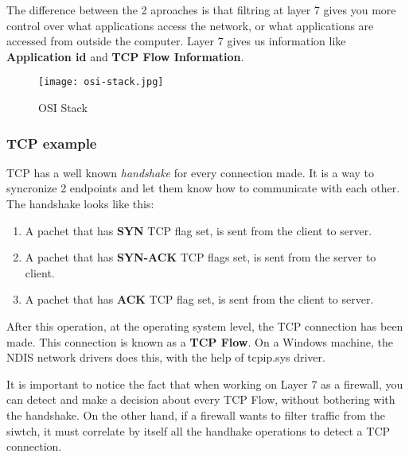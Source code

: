 \vspace{5mm}

The difference between the 2 aproaches is that filtring at layer 7 gives you more control over what applications access the network, or what applications
are accessed from outside the computer. Layer 7 gives us information like \textbf{Application id} and \textbf{TCP Flow Information}.

\vspace{5mm}

\begin{figure}[h]
\centering
\texttt{[image: osi-stack.jpg]}
\caption{OSI Stack}
\label{osi-stack}
\end{figure}

\vspace{5mm}
\subsubsection{TCP example}
\vspace{5mm}

TCP has a well known \textit{handshake} for every connection made. It is a way to syncronize 2 endpoints and let them know how to communicate with each other.
The handshake looks like this:

\vspace{5mm}
\begin{enumerate}
\item A pachet that has \textbf{SYN} TCP flag set, is sent from the client to server.
\item A pachet that has \textbf{SYN-ACK} TCP flags set, is sent from the server to client.
\item A pachet that has \textbf{ACK} TCP flag set, is sent from the client to server.
\end{enumerate}
\vspace{5mm}

After this operation, at the operating system level, the TCP connection has been made. This connection is known as a \textbf{TCP Flow}. On a Windows machine,
the NDIS network drivers does this, with the help of tcpip.sys driver.

\vspace{5mm}

It is important to notice the fact that when working on Layer 7 as a firewall, you can detect and make a decision about every TCP Flow, without bothering with
the handshake. On the other hand, if a firewall wants to filter traffic from the siwtch, it must correlate by itself all the handhake operations to detect a TCP connection.

